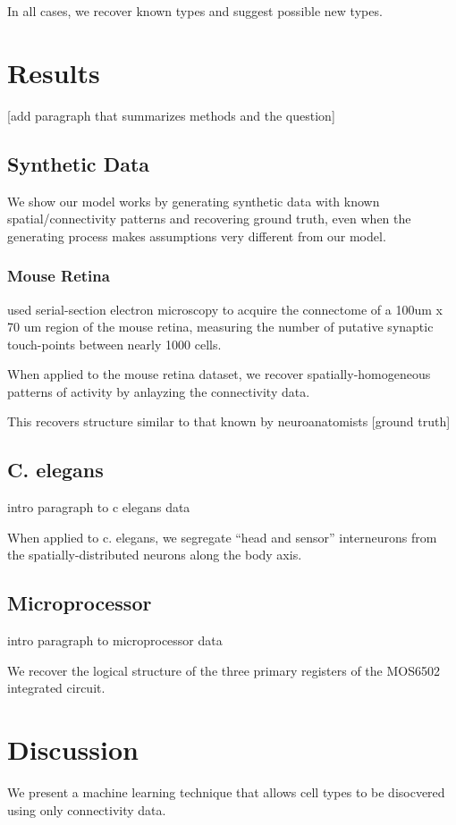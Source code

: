 \documentclass{article}
\begin{document}
In all cases, we recover known types and suggest possible new types. 


\section{Results}
[add paragraph that summarizes methods and the question]

\subsection{Synthetic Data}
We show our model works by generating synthetic data with known
spatial/connectivity patterns and recovering ground truth, even when
the generating process makes assumptions very different from our
model.

\subsubsection{Mouse Retina}
\autocite{retina} used serial-section electron microscopy to acquire the connectome
of a 100um x 70 um region of the mouse retina, measuring the number of putative
synaptic touch-points between nearly 1000 cells. 

When applied to the mouse retina dataset, we recover
spatially-homogeneous patterns of activity by anlayzing the
connectivity data.

This recovers structure similar to that known by neuroanatomists [ground truth]


\subsection{C. elegans}
intro paragraph to c elegans data

When applied to c. elegans, we segregate ``head and sensor'' interneurons from the spatially-distributed neurons along the body axis. 

\subsection{Microprocessor}
intro paragraph to microprocessor data 

We recover the logical structure of the three primary registers of the
MOS6502 integrated circuit.


\section{Discussion}
We present a machine learning technique that allows cell types to be
disocvered using only connectivity data. 
\end{document}

